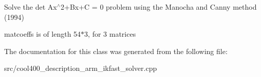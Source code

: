 Solve the det Ax$^\wedge$2+\-Bx+\-C = 0 problem using the Manocha and Canny method (1994) 

matcoeffs is of length 54$\ast$3, for 3 matrices 

The documentation for this class was generated from the following file\-:\begin{DoxyCompactItemize}
\item 
src/cool400\-\_\-description\-\_\-arm\-\_\-ikfast\-\_\-solver.\-cpp\end{DoxyCompactItemize}
